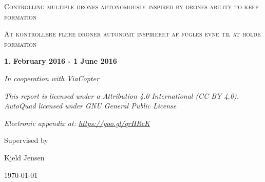 \begin{titlepage}
	\centering
	{\scshape\LARGE Controlling multiple drones autonomously inspired by drones ability to keep formation \par}
	\vspace{1cm}
	{\scshape\Large At kontrollere flere droner autonomt inspireret af fugles evne til at holde formation\par}
	\vspace{1.5cm}
	{\large\bfseries 1. February 2016 - 1 June 2016\par}
	\vspace{2cm}
	{\Large\itshape In cooperation with ViaCopter\par}
	\vspace{2cm}
	{\Large\itshape  This report is licensed under a  Attribution 4.0 International (CC BY 4.0). \\ AutoQuad licensed under GNU General Public License\par}
		{\Large\itshape  Electronic appendix at: \url{https://goo.gl/qrHRcK}\par}
	\vfill
	Supervised by\par
	Kjeld Jensen

	\vfill

	{\large \today\par}
\end{titlepage}
